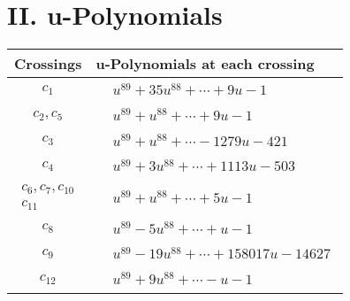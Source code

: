 \documentclass[1p]{elsarticle_modified}
\theoremstyle{definition}
\begin{document}
\newpage\renewcommand{\arraystretch}{1}
\centering \section*{ II. u-Polynomials}
\begin{tabular}{m{50pt}|m{274pt}}
Crossings & \hspace{64pt}u-Polynomials at each crossing \\
\hline $$\begin{aligned}c_{1}\end{aligned}$$&$\begin{aligned}
&u^{89}+35 u^{88}+\cdots+9 u-1
\end{aligned}$\\
\hline $$\begin{aligned}c_{2},c_{5}\end{aligned}$$&$\begin{aligned}
&u^{89}+u^{88}+\cdots+9 u-1
\end{aligned}$\\
\hline $$\begin{aligned}c_{3}\end{aligned}$$&$\begin{aligned}
&u^{89}+u^{88}+\cdots-1279 u-421
\end{aligned}$\\
\hline $$\begin{aligned}c_{4}\end{aligned}$$&$\begin{aligned}
&u^{89}+3 u^{88}+\cdots+1113 u-503
\end{aligned}$\\
\hline $$\begin{aligned}c_{6},c_{7},c_{10}\\c_{11}\end{aligned}$$&$\begin{aligned}
&u^{89}+u^{88}+\cdots+5 u-1
\end{aligned}$\\
\hline $$\begin{aligned}c_{8}\end{aligned}$$&$\begin{aligned}
&u^{89}-5 u^{88}+\cdots+u-1
\end{aligned}$\\
\hline $$\begin{aligned}c_{9}\end{aligned}$$&$\begin{aligned}
&u^{89}-19 u^{88}+\cdots+158017 u-14627
\end{aligned}$\\
\hline $$\begin{aligned}c_{12}\end{aligned}$$&$\begin{aligned}
&u^{89}+9 u^{88}+\cdots- u-1
\end{aligned}$\\
\hline
\end{tabular}\newpage\renewcommand{\arraystretch}{1}
\end{document}
